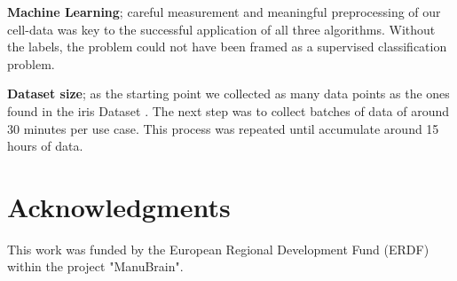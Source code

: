 \documentclass[5p,times,procedia]{elsarticle}
\begin{document}
\textbf{Machine Learning}; careful measurement and  meaningful preprocessing
of our cell-data was key to the successful application of all three algorithms.
Without the labels, the problem could not have been framed as a supervised 
classification problem.

\textbf{Dataset size}; as the starting point we collected as many data points as the ones found in the iris Dataset \cite{fisher_1936}. The next step was to collect batches of data of around 30 minutes per use case. This process was repeated until accumulate around 15 hours of data.

\section*{Acknowledgments}
This work was funded by the European Regional Development Fund (ERDF) within the project "ManuBrain".


\end{document}
